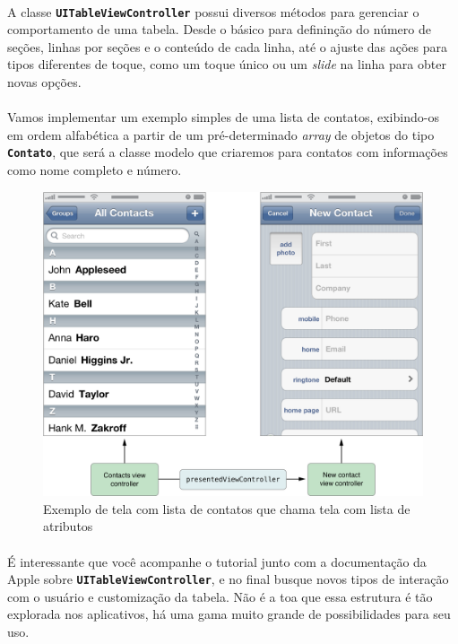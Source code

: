\documentclass[a4paper,12pt,brazil,doubleside]{book}
\begin{document}
\paragraph{}A classe \texttt{\textbf{UITableViewController}} possui diversos métodos para gerenciar o comportamento de uma tabela. Desde o básico para defininção do número de seções, linhas por seções e o conteúdo de cada linha, até o ajuste das ações para tipos diferentes de toque, como um toque único ou um \emph{slide} na linha para obter novas opções.
\paragraph{}Vamos implementar um exemplo simples de uma lista de contatos, exibindo-os em ordem alfabética a partir de um pré-determinado \emph{array} de objetos do tipo \texttt{\textbf{Contato}}, que será a classe modelo que criaremos para contatos com informações como nome completo e número.\\

\begin{figure}[h]
  \centering
  \includegraphics[totalheight=0.5\textheight]{figuras/apple_table_view_controller_contatos.png}
  \caption{Exemplo de tela com lista de contatos que chama tela com lista de atributos}
  \label{fig:a}
\end{figure}

\paragraph{}É interessante que você acompanhe o tutorial junto com a documentação da Apple sobre \texttt{\textbf{UITableViewController}}, e no final busque novos tipos de interação com o usuário e customização da tabela. Não é a toa que essa estrutura é tão explorada nos aplicativos, há uma gama muito grande de possibilidades para seu uso.\\
\end{document}
